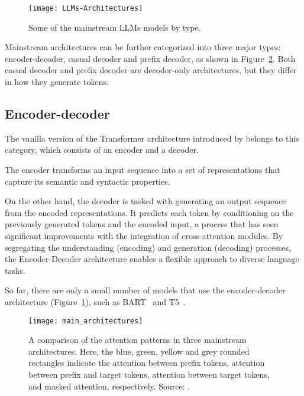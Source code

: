 \begin{figure}[H]
	\centering
	\texttt{[image: LLMs-Architectures]}
	\caption{Some of the mainstream LLMs models by type.}
	\label{fig:llms-architectures}
\end{figure}

Mainstream architectures can be further categorized into three major types: encoder-decoder, casual decoder and prefix decoder, as shown in Figure~\ref{fig:architectures}.
Both casual decoder and prefix decoder are decoder-only architectures, but they differ in how they generate tokens.

\subsection{Encoder-decoder}
\label{subsec:encoder-decoder}

The vanilla version of the Transformer architecture introduced by \textcite{vaswani2023attention} belongs to this category, which consists of an encoder and a decoder.

The encoder transforms an input sequence into a set of representations that capture its semantic and syntactic properties.

On the other hand, the decoder is tasked with generating an output sequence from the encoded representations.
It predicts each token by conditioning on the previously generated tokens and the encoded input, a process that has seen significant improvements with the integration of cross-attention modules.
By segregating the understanding (encoding) and generation (decoding) processes, the Encoder-Decoder architecture enables a flexible approach to diverse language tasks.

So far, there are only a small number of models that use the encoder-decoder architecture (Figure~\ref{fig:llms-architectures}), such as BART~\cite{lewis2020bart} and T5~\cite{raffel2023exploring}.

\begin{figure}[h]
	\centering
	\texttt{[image: main\_architectures]}
	\caption{A comparison of the attention patterns in three mainstream architectures. Here, the blue, green, yellow and grey rounded rectangles indicate the attention between prefix tokens, attention between prefix and target tokens, attention between target tokens, and masked attention, respectively. Source: \textcite{survey}.}
	\label{fig:architectures}
\end{figure}

